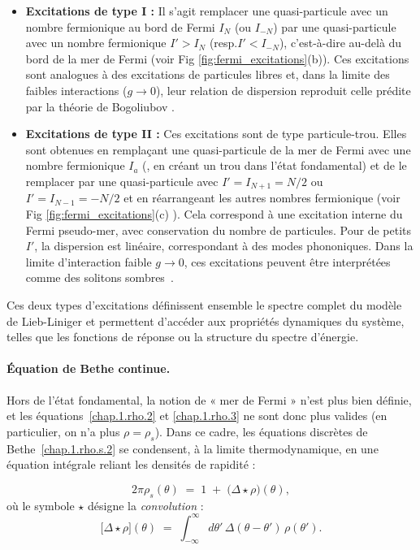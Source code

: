 \begin{itemize}[label = $\bullet$]
    \item \textbf{Excitations de type I :} Il s’agit remplacer une quasi-particule avec un nombre fermionique au bord de Fermi $I_{N}$ (ou $I_{-N}$) par une quasi-particule avec un nombre fermionique $I'> I_N$ (resp.$I' <I_{-N}$), c’est-à-dire au-delà du bord de la mer de Fermi (voir Fig \ref{fig:fermi_excitations}(b)). Ces excitations sont analogues à des excitations de particules libres et, dans la limite des faibles interactions ($g \to 0$), leur relation de dispersion reproduit celle prédite par la théorie de Bogoliubov .

    \item \textbf{Excitations de type II :} Ces excitations sont de type particule-trou. Elles sont obtenues en remplaçant une quasi-particule de la mer de Fermi avec une nombre fermionique $I_a$ (\ie, en créant un trou dans l’état fondamental) et de le remplacer par une quasi-particule avec $I' = I_{N+1} = N/2$ ou $I' = I_{N-1} = -N/2$ et en réarrangeant les autres nombres fermionique (voir Fig \ref{fig:fermi_excitations}(c) ). Cela correspond à une excitation interne du Fermi pseudo-mer, avec conservation du nombre de particules. Pour de petits $I'$, la dispersion est linéaire, correspondant à des modes phononiques. Dans la limite d’interaction faible \( g \to 0 \), ces excitations peuvent être interprétées comme des solitons sombres~\cite{Ishikawa1980SolitonsIA,Karpiuk_2015}.
\end{itemize}

Ces deux types d’excitations définissent ensemble le spectre complet du modèle de Lieb-Liniger et permettent d’accéder aux propriétés dynamiques du système, telles que les fonctions de réponse ou la structure du spectre d’énergie.

\paragraph{Équation de Bethe continue.}

Hors de l’état fondamental, la notion de « mer de Fermi » n’est plus bien définie, et les équations~\eqref{chap.1.rho.2} et \eqref{chap.1.rho.3} ne sont donc plus valides (en particulier, on n’a plus $\rho = \rho_s$).  
Dans ce cadre, les équations discrètes de Bethe~\eqref{chap.1.rho.s.2} se condensent, à la limite thermodynamique, en une équation intégrale reliant les densités de rapidité :

\begin{equation}\label{eq:TBA-rhos}
	2\pi \rho_s(\theta) \;=\; 1 \;+\; \bigl(\Delta \star \rho\bigr)(\theta),
\end{equation}
où le symbole $\star$ désigne la \emph{convolution} :
\[
	\bigl[\Delta \star \rho\bigr](\theta) \;=\; \int_{-\infty}^{\infty} d\theta'\, \Delta(\theta - \theta')\, \rho(\theta').
\]

